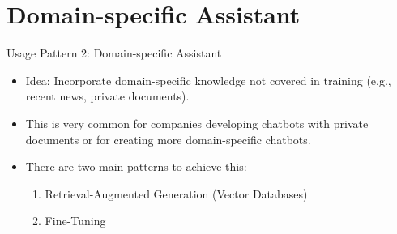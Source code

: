 \documentclass[handout]{beamer}
\begin{document}
\section{Domain-specific Assistant}

\begin{frame}{Usage Pattern 2: Domain-specific Assistant}
\begin{scriptsize}
\begin{itemize}
\item Idea: Incorporate domain-specific knowledge not covered in training (e.g., recent news, private documents).
\item This is very common for companies developing chatbots with private documents or for creating more domain-specific chatbots.
\item There are two main patterns to achieve this:
\begin{enumerate}\scriptsize
 \item Retrieval-Augmented Generation (Vector Databases)
 \item Fine-Tuning
\end{enumerate}
\end{itemize}


\end{scriptsize}
\end{frame}
\end{document}
